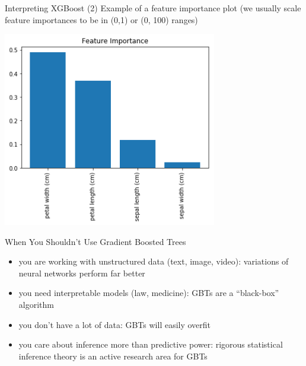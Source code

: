 \documentclass{beamer}
\begin{document}
    \begin{frame}{Interpreting XGBoost (2)}
        Example of a feature importance plot (we usually scale feature importances to be in (0,1) or (0, 100) ranges)

        \begin{center}
            \includegraphics[width=0.7\textwidth]{figures/feature_importance.png}
        \end{center}

    \end{frame}


    \begin{frame}{When You Shouldn't Use Gradient Boosted Trees}
        \begin{itemize}
            \item you are working with unstructured data (text, image, video): variations of neural networks perform far better 
            \item you need interpretable models (law, medicine): GBTs are a ``black-box'' algorithm
            \item you don't have a lot of data: GBTs will easily overfit
            \item you care about inference more than predictive power: rigorous statistical inference theory is an active research area for GBTs
        \end{itemize}
    \end{frame}
\end{document}
